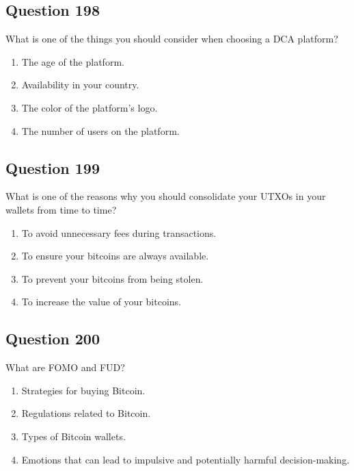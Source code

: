\documentclass[12pt,a4paper]{article}
\begin{document}
\bigskip


\subsection*{Question 198}
What is one of the things you should consider when choosing a DCA platform?

\begin{enumerate}[label=\Alph*., leftmargin=*]
\item The age of the platform.
\item Availability in your country.
\item The color of the platform's logo.
\item The number of users on the platform.
\end{enumerate}

\bigskip


\subsection*{Question 199}
What is one of the reasons why you should consolidate your UTXOs in your wallets from time to time?

\begin{enumerate}[label=\Alph*., leftmargin=*]
\item To avoid unnecessary fees during transactions.
\item To ensure your bitcoins are always available.
\item To prevent your bitcoins from being stolen.
\item To increase the value of your bitcoins.
\end{enumerate}

\bigskip


\subsection*{Question 200}
What are FOMO and FUD?

\begin{enumerate}[label=\Alph*., leftmargin=*]
\item Strategies for buying Bitcoin.
\item Regulations related to Bitcoin.
\item Types of Bitcoin wallets.
\item Emotions that can lead to impulsive and potentially harmful decision-making.
\end{enumerate}
\end{document}
